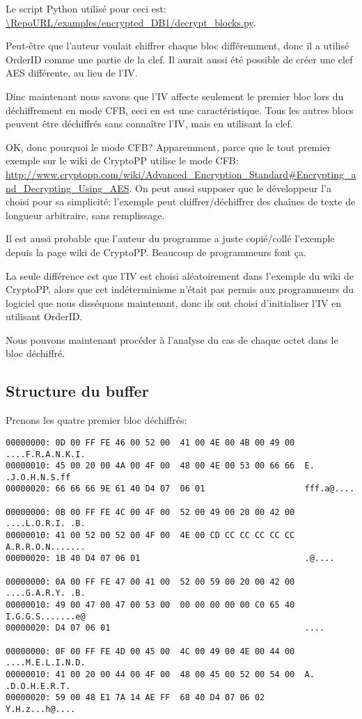 Le script Python utilisé pour ceci est:
\url{\RepoURL/examples/encrypted_DB1/decrypt_blocks.py}.

Peut-être que l'auteur voulait chiffrer chaque bloc différemment, donc il a utilisé
OrderID comme une partie de la clef.
Il aurait aussi été possible de créer une clef AES différente, au lieu de l'\ac{IV}.

Dinc maintenant nous savons que l'\ac{IV} affecte seulement le premier bloc lors
du déchiffrement en mode \ac{CFB}, ceci en est une caractéristique.
Tous les autres blocs peuvent être déchiffrés sans connaître l'\ac{IV}, mais en utilisant
la clef.

OK, donc pourquoi le mode \ac{CFB}? Apparemment, parce que le tout premier exemple
sur le wiki de CryptoPP utilise le mode \ac{CFB}:
\url{http://www.cryptopp.com/wiki/Advanced_Encryption_Standard#Encrypting_and_Decrypting_Using_AES}.
On peut aussi supposer que le développeur l'a choisi pour sa simplicité:
l'exemple peut chiffrer/déchiffrer des chaînes de texte de longueur arbitraire, sans
remplissage.

Il est aussi probable que l'auteur du programme a juste copié/collé l'exemple depuis
la page wiki de CryptoPP.
Beaucoup de programmeurs font ça.

La seule différence est que l'\ac{IV} est choisi aléatoirement dans l'exemple du
wiki de CryptoPP, alors que cet indéterminisme n'était pas permis aux programmeurs
du logiciel que nous disséquons maintenant, donc ils ont choisi d'initialiser l'\ac{IV}
en utilisant OrderID.

Nous pouvons maintenant procéder à l'analyse du cas de chaque octet dans le bloc
déchiffré.

\subsection{Structure du buffer}

Prenons les quatre premier bloc déchiffrés:

\begin{lstlisting}
00000000: 0D 00 FF FE 46 00 52 00  41 00 4E 00 4B 00 49 00  ....F.R.A.N.K.I.
00000010: 45 00 20 00 4A 00 4F 00  48 00 4E 00 53 00 66 66  E. .J.O.H.N.S.ff
00000020: 66 66 66 9E 61 40 D4 07  06 01                    fff.a@....

00000000: 0B 00 FF FE 4C 00 4F 00  52 00 49 00 20 00 42 00  ....L.O.R.I. .B.
00000010: 41 00 52 00 52 00 4F 00  4E 00 CD CC CC CC CC CC  A.R.R.O.N.......
00000020: 1B 40 D4 07 06 01                                 .@....

00000000: 0A 00 FF FE 47 00 41 00  52 00 59 00 20 00 42 00  ....G.A.R.Y. .B.
00000010: 49 00 47 00 47 00 53 00  00 00 00 00 00 C0 65 40  I.G.G.S.......e@
00000020: D4 07 06 01                                       ....

00000000: 0F 00 FF FE 4D 00 45 00  4C 00 49 00 4E 00 44 00  ....M.E.L.I.N.D.
00000010: 41 00 20 00 44 00 4F 00  48 00 45 00 52 00 54 00  A. .D.O.H.E.R.T.
00000020: 59 00 48 E1 7A 14 AE FF  68 40 D4 07 06 02        Y.H.z...h@....
\end{lstlisting}

